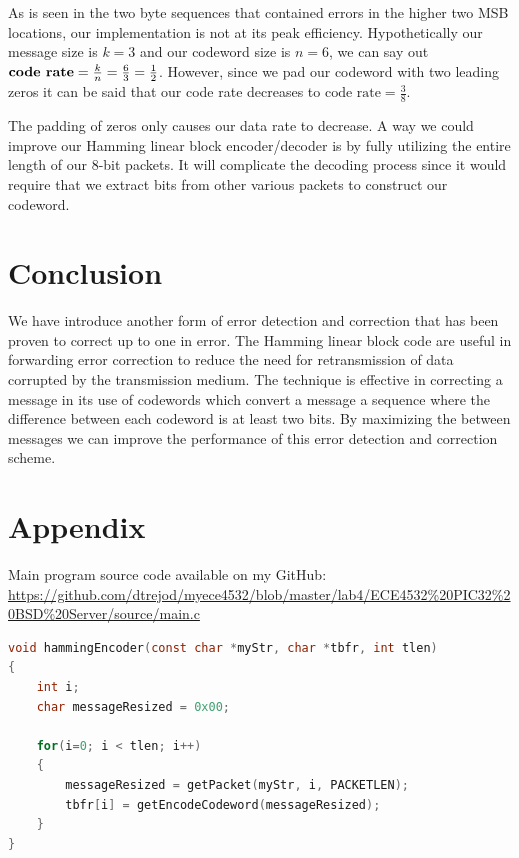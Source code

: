 \documentclass[12pt]{article}
\begin{document}
As is seen in the two byte sequences that contained errors in the higher two
MSB locations, our implementation is not at its peak efficiency. 
Hypothetically our message size is $k=3$ and our codeword size is $n=6$, 
we can say out $\text{\textbf{code rate}} =\frac{k}{n} = \frac{6}{3} = 
\frac{1}{2}$. However, since we pad our codeword with two leading zeros it 
can be said that our code rate decreases to $\text{code rate} = \frac{3}{8}$.

The padding of zeros only causes our data rate to decrease. A way we could
improve our Hamming linear block encoder/decoder is by fully utilizing the 
entire length of our 8-bit packets. It will complicate the decoding process
since it would require that we extract bits from other various packets to 
construct our codeword.

\section{Conclusion}
\label{sect:conclusion} 
We have introduce another form of error detection and correction that has 
been proven to correct up to one in error. The Hamming linear block code 
are useful in forwarding error correction to reduce the need for 
retransmission of data corrupted by the transmission medium. The technique 
is effective in correcting a message in its use of codewords which convert
a message a sequence where the difference between each codeword is at least
two bits. By maximizing the between messages we can improve the performance
of this error detection and correction scheme.




\section*{Appendix}
\label{sect:appendix}
Main program source code available on my GitHub: \\
\url{https://github.com/dtrejod/myece4532/blob/master/lab4/ECE4532%20PIC32%20BSD%20Server/source/main.c}

\begin{lstlisting}[language=c, 
caption=Hamming Encoder Function,
label=lst:hamencoder]
void hammingEncoder(const char *myStr, char *tbfr, int tlen) 
{
    int i;
    char messageResized = 0x00;
    
    for(i=0; i < tlen; i++)
    {
        messageResized = getPacket(myStr, i, PACKETLEN);
        tbfr[i] = getEncodeCodeword(messageResized);
    }
}
\end{lstlisting}
\end{document}
